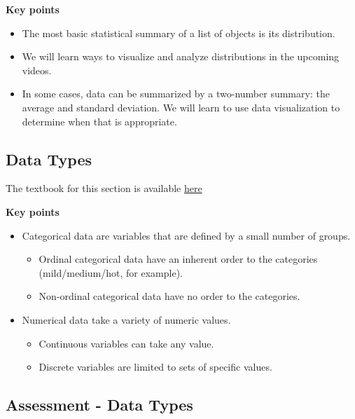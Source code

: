 \documentclass[]{article}
\providecommand{\tightlist}{%
  \setlength{\itemsep}{0pt}\setlength{\parskip}{0pt}}
\begin{document}
\textbf{Key points}

\begin{itemize}
\tightlist
\item
  The most basic statistical summary of a list of objects is its
  distribution.
\item
  We will learn ways to visualize and analyze distributions in the
  upcoming videos.
\item
  In some cases, data can be summarized by a two-number summary: the
  average and standard deviation. We will learn to use data
  visualization to determine when that is appropriate.
\end{itemize}

\hypertarget{data-types}{%
\subsection{Data Types}\label{data-types}}

The textbook for this section is available
\href{https://rafalab.github.io/dsbook/distributions.html\#variable-types}{here}

\textbf{Key points}

\begin{itemize}
\tightlist
\item
  Categorical data are variables that are defined by a small number of
  groups.

  \begin{itemize}
  \tightlist
  \item
    Ordinal categorical data have an inherent order to the categories
    (mild/medium/hot, for example).
  \item
    Non-ordinal categorical data have no order to the categories.
  \end{itemize}
\item
  Numerical data take a variety of numeric values.

  \begin{itemize}
  \tightlist
  \item
    Continuous variables can take any value.
  \item
    Discrete variables are limited to sets of specific values.
  \end{itemize}
\end{itemize}

\hypertarget{assessment---data-types}{%
\subsection{Assessment - Data Types}\label{assessment---data-types}}
\end{document}
